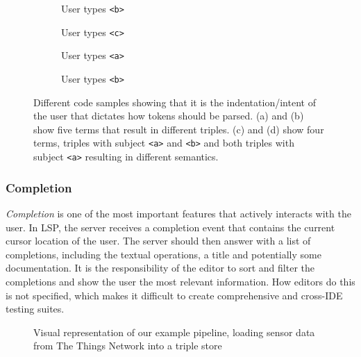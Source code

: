 \begin{figure}[tb]
    \centering
    \begin{subfigure}{0.21\textwidth}
      
      \caption{User types \texttt{<b>}}
      \label{code1}
    \end{subfigure}
    \hfill
    \begin{subfigure}{0.21\textwidth}
      
      \caption{User types \texttt{<c>}}
      \label{code2}
    \end{subfigure}
    \hfill
    \begin{subfigure}{0.21\textwidth}
      
      \caption{User types \texttt{<a>}}
      \label{code3}
    \end{subfigure}
    \hfill
    \begin{subfigure}{0.21\textwidth}
      
      \caption{User types \texttt{<b>}}
      \label{code4}
    \end{subfigure}
    \caption{Different code samples showing that it is the indentation/intent of the user that dictates how tokens should be parsed. (a) and (b) show five terms that result in different triples. (c) and (d) show four terms, triples with subject \texttt{<a>} and \texttt{<b>} and both triples with subject \texttt{<a>} resulting in different semantics.    }\label{lst:GroupedListing}
\end{figure}



\subsubsection{Completion}

\textit{Completion} is one of the most important features that actively interacts with the user.
In LSP, the server receives a completion event that contains the current cursor location of the user.
The server should then answer with a list of completions, including the textual operations, a title and potentially some documentation.
It is the responsibility of the editor to sort and filter the completions and show the user the most relevant information.
How editors do this is not specified, which makes it difficult to create comprehensive and cross-IDE testing suites.

\begin{figure}[!ht]
 \centering
  \caption{Visual representation of our example pipeline, 
      loading sensor data from The Things Network into a triple store}\label{fig:Completion}
\end{figure}

